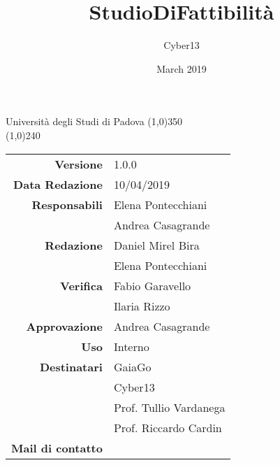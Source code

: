 \documentclass[a4paper, 12pt]{article}
\title{StudioDiFattibilità}
\author{Cyber13}
\date{March 2019}
\begin{document}
	\begin{titlepage}
		\centering Università degli Studi di Padova
		\line(1,0){350}\\
		\vspace{1.2cm}
		\logo
		\vspace{1.0cm}
		\vspace{0.5cm}
		\vspace{0.5cm}
		\line(1,0){240}\\
		\begin{tabular}{r|l}
			{\textbf{Versione}} 			& 1.0.0\\
			{\textbf{Data Redazione}} 	& 10/04/2019\\	%
			{\textbf{Responsabili}} 	& Elena Pontecchiani\\ & Andrea Casagrande\\	%
			{\textbf{Redazione}} 		& Daniel Mirel Bira\\ & Elena Pontecchiani\\
			{\textbf{Verifica}} 		& Fabio Garavello\\ & Ilaria Rizzo\\
			{\textbf{Approvazione}} 	& Andrea Casagrande\\
			{\textbf{Uso}} 				& Interno\\
			{\textbf{Destinatari}} & GaiaGo \\	& Cyber13 \\ & Prof. Tullio Vardanega\\ & Prof. Riccardo Cardin\\
			{\textbf{Mail di contatto}} 	& \emailgruppo \\
		\end{tabular}\\
	\end{titlepage}
    \newpage
        \setcounter{secnumdepth}{0} %
		\tableofcontents
	\newpage
	    
	    
	
            
\end{document}
